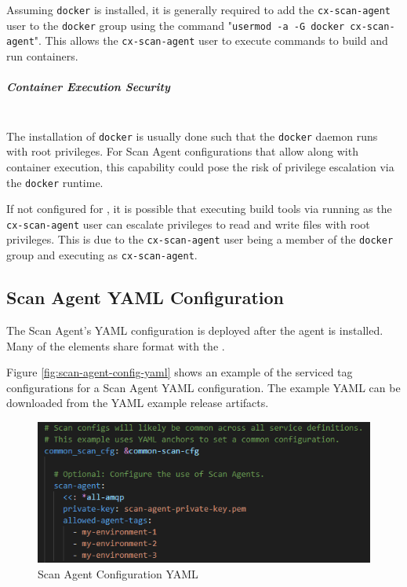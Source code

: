 Assuming \texttt{docker} is installed, it is generally required to add the \texttt{cx-scan-agent} user to the \texttt{docker}
group using the command "\texttt{usermod -a -G docker cx-scan-agent}".  This allows the \texttt{cx-scan-agent} user to execute
commands to build and run containers.

\subparagraph{Container Execution Security}
\noindent\\The installation of \texttt{docker} is usually done such that the \texttt{docker} daemon runs with
root privileges.  For Scan Agent configurations that allow 
 along with container execution, this capability could pose
the risk of privilege escalation via the \texttt{docker} runtime.

If not configured for , it is possible that
executing build tools via \scaresolver running as the \texttt{cx-scan-agent} user can escalate privileges
to read and write files with root privileges.  This is due to the \texttt{cx-scan-agent} user being a member of
the \texttt{docker} group and \scaresolver executing as \texttt{cx-scan-agent}.  


\subsection{Scan Agent YAML Configuration}\label{sec:agent-yaml-config}

The Scan Agent's YAML configuration is deployed after the agent is installed.
Many of the elements share format with the . 


Figure \ref{fig:scan-agent-config-yaml} shows an example of the serviced tag configurations for 
a Scan Agent YAML configuration.  The example YAML can be downloaded from the \cxoneflow YAML
example release artifacts.

\begin{figure}[h]
    \includegraphics[scale=1]{graphics/scan-agent-config-yaml.png}
    \centering
    \caption{Scan Agent Configuration YAML}
    \label{fig:resolver-agent-config-yaml}
\end{figure}

